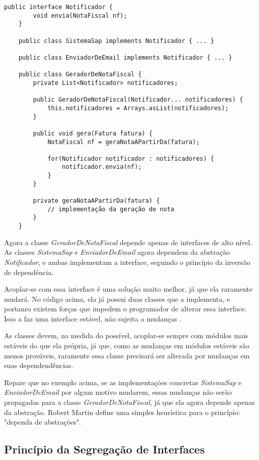 \begin{lstlisting}[frame=trbl]
	public interface Notificador {
		void envia(NotaFiscal nf);
	}
	
	public class SistemaSap implements Notificador { ... }
	
	public class EnviadorDeEmail implements Notificador { ... }
	
	public class GeradorDeNotaFiscal {
		private List<Notificador> notificadores;
		
		public GeradorDeNotaFiscal(Notificador... notificadores) {
			this.notificadores = Arrays.asList(notificadores);
		}
		
		public void gera(Fatura fatura) {
			NotaFiscal nf = geraNotaAPartirDa(fatura);
			
			for(Notificador notificador : notificadores) {
				notificador.envia(nf);
			}
		}
		
		private geraNotaAPartirDa(fatura) {
			// implementação da geração de nota
		}
	}
\end{lstlisting}

Agora a classe \textit{GeradorDeNotaFiscal} depende apenas de interfaces de alto
nível. As classes \textit{SistemaSap} e \textit{EnviadorDeEmail} agora dependem
da abstração \textit{Notificador}, e ambas implementam a interface, seguindo o
princípio da inversão de dependência. 

Acoplar-se com essa interface é uma solução muito melhor, já que ela raramente
mudará. No código acima, ela já possui duas classes que a implementa, e portanro
existem forças que impedem o programador de alterar essa interface. Isso a
faz uma interface estável, não sujeita a mudanças \cite{bobmartin-oodmetrics}. 

As classes devem, na medida do possível, acoplar-se sempre com módulos mais
estáveis do que ela própria, já que, como as mudanças em módulos estáveis são
menos prováveis, raramente essa classe precisará ser alterada por mudanças em
suas dependendências.

Repare que no exemplo acima, se as implementações concretas \textit{SistemaSap}
e \textit{EnviadorDeEmail} por algum motivo mudarem, essas mudanças não serão
propagadas para a classe \textit{GeradorDeNotaFiscal}, já que ela agora depende
apenas da abstração. Robert Martin define uma simples heurística para o
princípio: "dependa de abstrações".

\subsection{Princípio da Segregação de Interfaces}
\label{subsec:isp}


